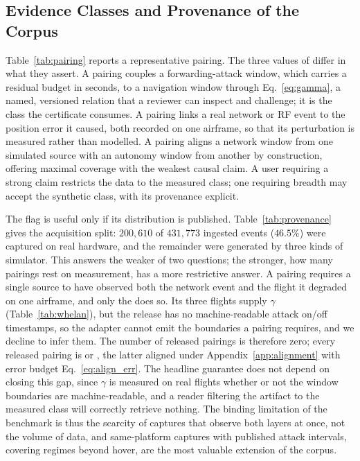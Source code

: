 \subsection{Evidence Classes and Provenance of the Corpus}
\label{sec:provenance_dist}
Table~\ref{tab:pairing} reports a representative pairing. The three values of
 differ in what they assert. A 
pairing couples a forwarding-attack window, which carries a residual budget in
seconds, to a navigation window through Eq.~\eqref{eq:gamma}, a named,
versioned relation that a reviewer can inspect and challenge; it is the class
the certificate consumes. A  pairing links a real
network or RF event to the position error it caused, both recorded on one
airframe, so that its perturbation is measured rather than modelled. A
 pairing aligns a network window from one simulated
source with an autonomy window from another by construction, offering maximal
coverage with the weakest causal claim. A user requiring a strong claim
restricts the data to the measured class; one requiring breadth may accept the
synthetic class, with its provenance explicit.

The flag is useful only if its distribution is published.
Table~\ref{tab:provenance} gives the acquisition split: $200{,}610$ of
$431{,}773$ ingested events ($46.5\%$) were captured on real hardware, and the
remainder were generated by three kinds of simulator. This answers the weaker
of two questions; the stronger, how many pairings rest on measurement, has a
more restrictive answer. A  pairing requires a
single source to have observed both the network event and the flight it
degraded on one airframe, and only the  does so. Its
three flights supply $\gamma$ (Table~\ref{tab:whelan}), but the release has no
machine-readable attack on/off timestamps, so the adapter cannot emit the
 boundaries a pairing requires, and we decline to infer
them. The number of released  pairings is
therefore zero; every released pairing is  or
, the latter aligned under
Appendix~\ref{app:alignment} with error budget Eq.~\eqref{eq:align_err}. The
headline guarantee does not depend on closing this gap, since $\gamma$ is
measured on real flights whether or not the window boundaries are
machine-readable, and a reader filtering the artifact to the measured class will
correctly retrieve nothing. The binding limitation of the benchmark is thus the
scarcity of captures that observe both layers at once, not the volume of data,
and same-platform captures with published attack intervals, covering regimes
beyond hover, are the most valuable extension of the corpus.

